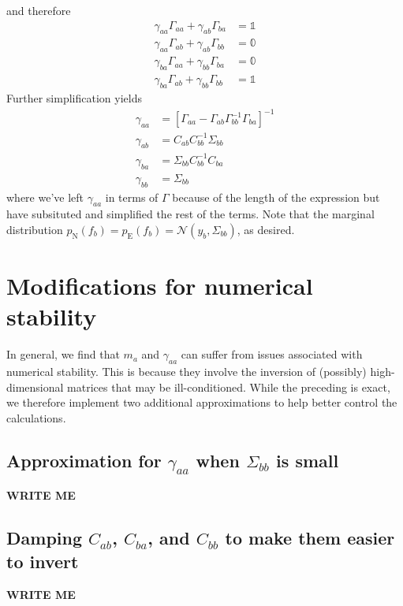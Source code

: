 \documentclass[onecolumn]{article}
\begin{document}
and therefore
\begin{align}
    \gamma_{aa} \Gamma_{aa} + \gamma_{ab} \Gamma_{ba} & = \mathbb{1} \\
    \gamma_{aa} \Gamma_{ab} + \gamma_{ab} \Gamma_{bb} & = \mathbb{0} \\
    \gamma_{ba} \Gamma_{aa} + \gamma_{bb} \Gamma_{ba} & = \mathbb{0} \\
    \gamma_{ba} \Gamma_{ab} + \gamma_{bb} \Gamma_{bb} & = \mathbb{1}
\end{align}
Further simplification yields
\begin{align}
    \gamma_{aa} & = \left[\Gamma_{aa} - \Gamma_{ab} \Gamma_{bb}^{-1} \Gamma_{ba} \right]^{-1} \\
    \gamma_{ab} & = C_{ab} C_{bb}^{-1} \Sigma_{bb} \\
    \gamma_{ba} & = \Sigma_{bb} C_{bb}^{-1} C_{ba} \\
    \gamma_{bb} & = \Sigma_{bb}
\end{align}
where we've left $\gamma_{aa}$ in terms of $\Gamma$ because of the length of the expression but have subsituted and simplified the rest of the terms.
Note that the marginal distribution $p_\mathrm{N}(f_b) = p_\mathrm{E}(f_b) = \mathcal{N}(y_b,\Sigma_{bb})$, as desired.


\section*{Modifications for numerical stability}
\label{sec:numerical stability}

In general, we find that $m_a$ and $\gamma_{aa}$ can suffer from issues associated with numerical stability.
This is because they involve the inversion of (possibly) high-dimensional matrices that may be ill-conditioned.
While the preceding is exact, we therefore implement two additional approximations to help better control the calculations.


\subsection*{Approximation for $\gamma_{aa}$ when $\Sigma_{bb}$ is small}

\textbf{WRITE ME}


\subsection*{Damping $C_{ab}$, $C_{ba}$, and $C_{bb}$ to make them easier to invert}

\textbf{WRITE ME}

\end{document}
